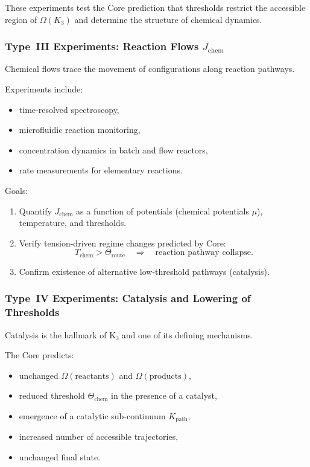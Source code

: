 These experiments test the Core prediction that thresholds restrict the 
accessible region of $\Omega(K_3)$ and determine the structure of 
chemical dynamics.



\subsubsection{Type~III Experiments: Reaction Flows $J_{\mathrm{chem}}$}

Chemical flows trace the movement of configurations along reaction pathways.

Experiments include:

\begin{itemize}
    \item time-resolved spectroscopy,
    \item microfluidic reaction monitoring,
    \item concentration dynamics in batch and flow reactors,
    \item rate measurements for elementary reactions.
\end{itemize}

Goals:

\begin{enumerate}
    \item Quantify $J_{\mathrm{chem}}$ as a function of potentials 
          (chemical potentials $\mu$), temperature, and thresholds.
    \item Verify tension-driven regime changes predicted by Core:
          \[
             T_{\mathrm{chem}} > \Theta_{\mathrm{route}}
             \quad \Rightarrow \quad
             \text{reaction pathway collapse}.
          \]
    \item Confirm existence of alternative low-threshold pathways 
          (catalysis).
\end{enumerate}



\subsubsection{Type~IV Experiments: Catalysis and Lowering of Thresholds}

Catalysis is the hallmark of K₃ and one of its defining mechanisms.

The Core predicts:

\begin{itemize}
    \item unchanged $\Omega(\text{reactants})$ and $\Omega(\text{products})$,
    \item reduced threshold $\Theta_{\mathrm{chem}}$ in the presence of a 
          catalyst,
    \item emergence of a catalytic sub-continuum $K_{\mathrm{path}}$,
    \item increased number of accessible trajectories,
    \item unchanged final state.
\end{itemize}

